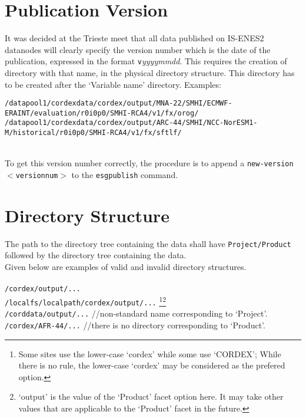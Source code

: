 \section{Publication Version}
It was decided at the Trieste meet that all data published on IS-ENES2 datanodes will clearly specify the version number which is the date of the publication, expressed in the format \texttt{v}\textit{yyyymmdd}. This requires the creation of directory with that name, in the physical directory structure. This directory has to be created after the `Variable name' directory. Examples:\\
\begin{tiny}
\texttt{/datapool1/cordexdata/cordex/output/MNA-22/SMHI/ECMWF-ERAINT/evaluation/r0i0p0/SMHI-RCA4/v1/fx/orog/}\\
\texttt{/datapool1/cordexdata/cordex/output/ARC-44/SMHI/NCC-NorESM1-M/historical/r0i0p0/SMHI-RCA4/v1/fx/sftlf/}\\
\end{tiny}
\\To get this version number correctly, the procedure is to append a \texttt{\myopt new-version $<$versionnum$>$} to the \texttt{esgpublish} command.

\section{Directory Structure}
The path to the directory tree containing the data shall have \texttt{Project/Product} followed by the directory tree containing the data. \\
Given below are examples of valid and invalid directory structures.\\
\vspace{0mm}\\
\texttt{/cordex/output/...} \cmark\\
\texttt{/localfs/localpath/cordex/output/...} \footnote{Some sites use the lower-case `cordex' while some use `CORDEX'; While there is no rule, the lower-case `cordex' may be considered as the prefered option.}\footnote{`output' is the value of the `Product' facet option here. It may take other values that are applicable to the `Product' facet in the future.} \cmark\\
\texttt{/corddata/output/...} \xmark{ } //non-standard name corresponding to `Project'.  \\ 
\texttt{/cordex/AFR-44/...} \xmark{ } //there is no directory corresponding to `Product'.

